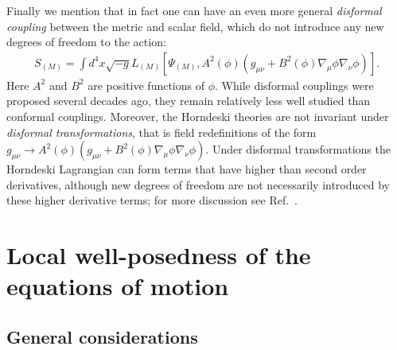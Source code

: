 \documentclass{ws-ijmpd}
\begin{document}
Finally we mention that in fact one can have an even more general
\emph{disformal coupling} between the metric and 
scalar field\cite{Bekenstein:1992pj}, which do not introduce
any new degrees of freedom to the action:
\begin{align}
   S_{(M)}
   =
   \int d^4x\sqrt{-g}L_{(M)}\left[
      \Psi_{(M)},A^2\left(\phi\right)
      \left(
         g_{\mu\nu}
         +
         B^2\left(\phi\right)\nabla_{\mu}\phi\nabla_{\nu}\phi
      \right)
   \right]
   .
\end{align}
Here $A^2$ and $B^2$ are positive functions of $\phi$.
While disformal couplings were proposed several decades 
ago\cite{Bekenstein:1992pj}, they remain relatively less well studied
than conformal couplings.
Moreover, the Horndeski theories are not invariant under \emph{disformal
transformations}, that is field redefinitions of the form 
$g_{\mu\nu}\to
      A^2\left(\phi\right)
      \left(
         g_{\mu\nu}
         +
         B^2\left(\phi\right)\nabla_{\mu}\phi\nabla_{\nu}\phi
      \right)$.
Under disformal transformations the Horndeski Lagrangian can form
terms that have higher than second order derivatives, although
new degrees of freedom are not necessarily introduced by these
higher derivative terms; 
for more discussion see Ref.~.
\section{Local well-posedness of the equations of motion
\label{sec:local_well_posedness}
}
\subsection{General considerations\label{sec:general_considerations}}
	
\end{document}
